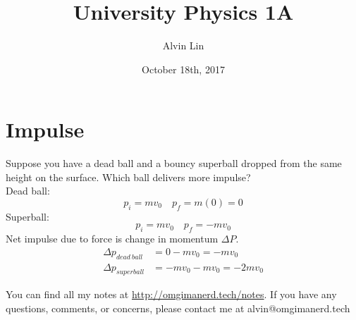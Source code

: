 \documentclass{math}
\title{University Physics 1A}
\author{Alvin Lin}
\date{October 18th, 2017}
\begin{document}
\maketitle

\section*{Impulse}
Suppose you have a dead ball and a bouncy superball dropped from the same
height on the surface. Which ball delivers more impulse? \\
Dead ball:
\[ p_i = mv_0 \quad p_f = m(0) = 0 \]
Superball:
\[ p_i = mv_0 \quad p_f = -mv_0 \]
Net impulse due to force is change in momentum \( \Delta{P} \).
\begin{align*}
  \Delta{p}_{dead~ball} &= 0-mv_0 = -mv_0 \\
  \Delta{p}_{superball} &= -mv_0-mv_0 = -2mv_0
\end{align*}

\begin{center}
  You can find all my notes at \url{http://omgimanerd.tech/notes}. If you have
  any questions, comments, or concerns, please contact me at
  alvin@omgimanerd.tech
\end{center}
\end{document}
